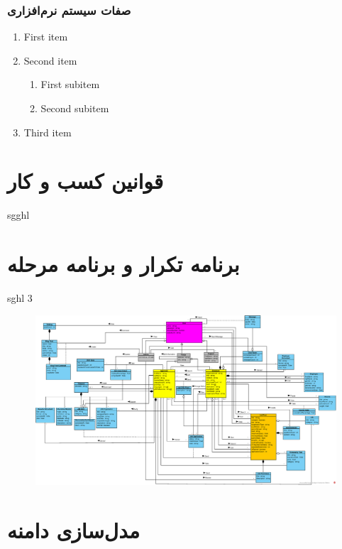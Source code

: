 \documentclass[12pt]{article}
\begin{document}
	\subsubsection{صفات سیستم نرم‌افزاری}

		\begin{enumerate}
			\renewcommand{\labelenumi}{R\arabic{enumi}}
			\item First item
			\item Second item
			\begin{enumerate}
			\renewcommand{\labelenumii}{R\arabic{enumi}.\arabic{enumii}}
			\item First subitem
			\item Second subitem
			\end{enumerate}
		\item Third item
	\end{enumerate}

	\newpage
	\section{قوانین کسب و کار}
	sgghl
	\newpage
	\section{برنامه تکرار و برنامه مرحله}
	sghl 3

	\begin{figure}
		\centering
		\includegraphics[width=1.5\linewidth]{files/Project_OOAD_Phase2_DiagramClass_V5_EnglishVersion}
		\caption{}
		\label{fig:projectooadphase2diagramclassv5englishversion}
	\end{figure}

	\newpage
	\section{مدل‌سازی دامنه}
	\newpage
\end{document}
